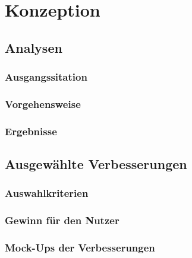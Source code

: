 \chapter{Konzeption}\label{ch:method}

\section {Analysen}
\subsection{Ausgangssitation}
\subsection{Vorgehensweise}
\subsection{Ergebnisse}

\section{Ausgewählte Verbesserungen}
\subsection{Auswahlkriterien}
\subsection{Gewinn für den Nutzer}
\subsection{Mock-Ups der Verbesserungen}